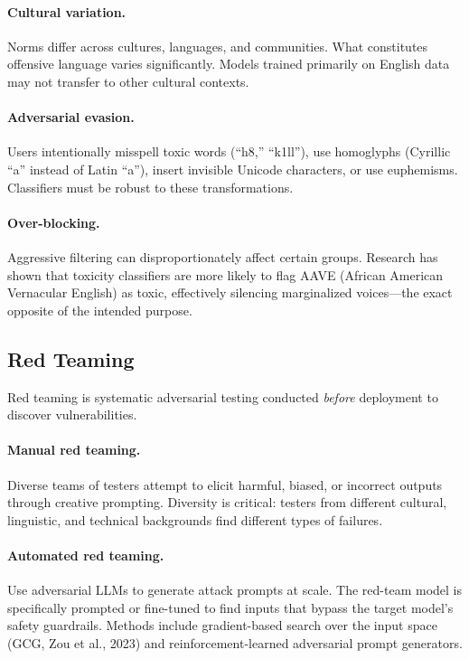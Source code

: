 \paragraph{Cultural variation.}
Norms differ across cultures, languages, and communities.  What constitutes
offensive language varies significantly.  Models trained primarily on English
data may not transfer to other cultural contexts.

\paragraph{Adversarial evasion.}
Users intentionally misspell toxic words (``h8,'' ``k1ll''), use homoglyphs
(Cyrillic ``a'' instead of Latin ``a''), insert invisible Unicode characters,
or use euphemisms.  Classifiers must be robust to these transformations.

\paragraph{Over-blocking.}
Aggressive filtering can disproportionately affect certain groups.  Research
has shown that toxicity classifiers are more likely to flag AAVE (African
American Vernacular English) as toxic, effectively silencing marginalized
voices---the exact opposite of the intended purpose.

\subsection{Red Teaming}
\label{sec:red_teaming}

Red teaming is systematic adversarial testing conducted \emph{before}
deployment to discover vulnerabilities.

\paragraph{Manual red teaming.}
Diverse teams of testers attempt to elicit harmful, biased, or incorrect
outputs through creative prompting.  Diversity is critical: testers from
different cultural, linguistic, and technical backgrounds find different
types of failures.

\paragraph{Automated red teaming.}
Use adversarial LLMs to generate attack prompts at scale.  The red-team model
is specifically prompted or fine-tuned to find inputs that bypass the target
model's safety guardrails.  Methods include gradient-based search over the
input space (GCG, Zou et al., 2023) and reinforcement-learned adversarial
prompt generators.

